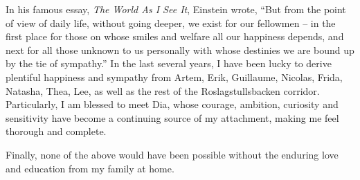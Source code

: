 \begin{acknowledgements}
  In his famous essay, \emph{\small The World As I See It}, Einstein wrote,
  ``But from the point of view of daily life, without going deeper, we exist for our fellowmen --
  in the first place for those on whose smiles and welfare all our happiness depends,
  and next for all those unknown to us personally with whose destinies we are bound up by the tie of sympathy.''
  In the last several years, I have been lucky to derive plentiful happiness and sympathy from Artem, Erik, Guillaume, Nicolas, Frida, Natasha, Thea, Lee,
  as well as the rest of the Roslagstullsbacken corridor.
  Particularly, I am blessed to meet Dia, whose courage, ambition, curiosity and sensitivity have become a continuing source of my attachment,
  making me feel thorough and complete.
  
  Finally, none of the above would have been possible without the enduring love and education from my family at home.
  
  


  
  
\end{acknowledgements}
